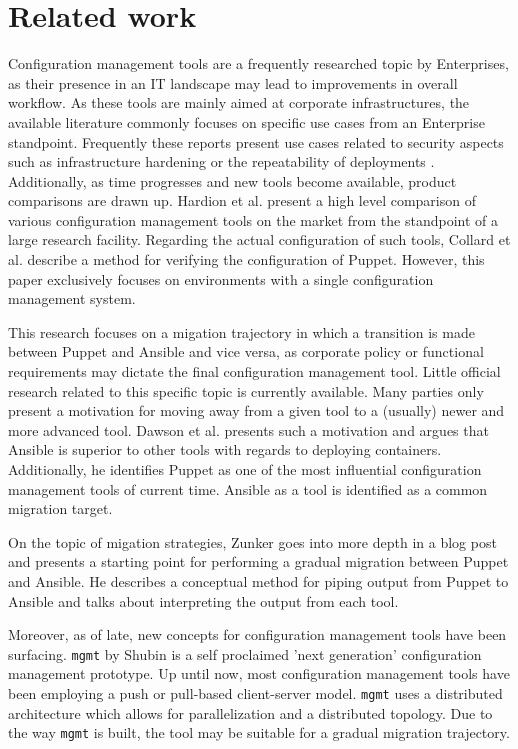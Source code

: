 \section{Related work}\label{sec:relatedwork}
Configuration management tools are a frequently researched topic by Enterprises, as their presence in an IT landscape  may lead to improvements in overall workflow. As these tools are mainly aimed at corporate infrastructures, the available literature commonly focuses on specific use cases from an Enterprise standpoint. Frequently these reports present use cases related to security aspects such as infrastructure hardening \cite{dotson2014security} or the repeatability of deployments \cite{ruiz2015reconstructable}. Additionally, as time progresses and new tools become available, product comparisons are drawn up. Hardion et al. \cite{Hardion2013} present a high level comparison of various configuration management tools on the market from the standpoint of a large research facility. Regarding the actual configuration of such tools, Collard et al. \cite{Collard2015} describe a method for verifying the configuration of Puppet. However, this paper exclusively focuses on environments with a single configuration management system. 

This research focuses on a migation trajectory in which a transition is made between Puppet and Ansible and vice versa, as corporate policy or functional requirements may dictate the final configuration management tool. Little official research related to this specific topic is currently available. Many parties only present a motivation for moving away from a given tool to a (usually) newer and more advanced tool. Dawson et al. \cite{dawson_hall_hecht_2014} presents such a motivation and argues that Ansible is superior to other tools with regards to deploying containers. Additionally, he identifies Puppet as one of the most influential configuration management tools of current time. Ansible as a tool is identified as a common migration target. 

On the topic of migation strategies, Zunker \cite{zunker_2014} goes into more depth in a blog post and presents a starting point for performing a gradual migration between Puppet and Ansible. He describes a conceptual method for piping output from Puppet to Ansible and talks about interpreting the output from each tool.

Moreover, as of late, new concepts for configuration management tools have been surfacing. \texttt{mgmt} by Shubin \cite{shubin2016} is a self proclaimed 'next generation' configuration management prototype.  Up until now, most configuration management tools have been employing a push or pull-based client-server model. \texttt{mgmt} uses a distributed architecture which allows for parallelization and a distributed topology. Due to the way \texttt{mgmt} is built, the tool may be suitable for a gradual migration trajectory.


